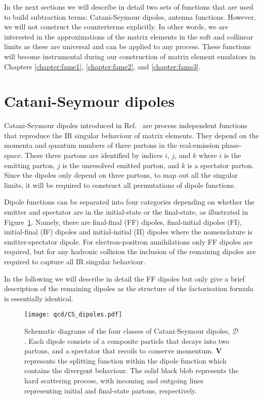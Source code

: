 \documentclass[main.tex]{subfiles}
\begin{document}
    In the next sections we will describe in detail two sets of functions
    that are used to build subtraction terms: Catani-Seymour dipoles,
    antenna functions. However, we will not construct the counterterms explicitly.
    In other words, we are interested in the approximations of the matrix elements
    in the soft and collinear limits as these are universal and can
    be applied to any process. These functions will become instrumental
    during our construction of matrix element emulators in Chapters
    \ref{chapter:fame1}, \ref{chapter:fame2}, and \ref{chapter:fame3}.

\section{Catani-Seymour dipoles}\label{sec:CS_dipoles}
    Catani-Seymour dipoles introduced in Ref.~\cite{Catani:1996vz}
    are process independent functions that reproduce the IR
    singular behaviour of matrix elements. They depend on the
    momenta and quantum numbers of three partons in the real-emission
    phase-space. These three partons are identified by indices
    $i$, $j$, and $k$ where $i$ is the emitting parton, $j$ is
    the unresolved emitted parton, and $k$ is a spectator parton.
    Since the dipoles only depend on three partons, to map out
    all the singular limits, it will be required to construct all
    permutations of dipole functions.

    Dipole functions can be separated into four categories
    depending on whether the emitter and spectator are in the
    initial-state or the final-state, as illustrated in Figure~\ref{fig:CS_dipoles}.
    Namely, there are final-final (FF) dipoles, final-initial dipoles (FI),
    initial-final (IF) dipoles and initial-initial (II) dipoles where
    the nomenclature is emitter-spectator dipole.
    For electron-positron annihilations only FF dipoles are required,
    but for any hadronic collision the inclusion of the remaining
    dipoles are required to capture all IR singular behaviour.

    In the following we will describe in detail the FF dipoles
    but only give a brief description of the remaining dipoles as
    the structure of the factorisation formula is essentially identical.

    \begin{figure}
        \texttt{[image: qcd/CS\_dipoles.pdf]}
        \caption{Schematic diagrams of the four classes of Catani-Seymour
        dipoles, $\mathcal{D}$. Each dipole consists of a composite particle
        that decays into two partons, and a spectator that recoils
        to conserve momentum. $\boldsymbol{V}$ represents the splitting
        function within the dipole function which contains the divergent
        behaviour. The solid black blob represents the hard scattering process,
        with incoming and outgoing lines representing initial and final-state
        partons, respectively.}
        \label{fig:CS_dipoles}
    \end{figure}
\end{document}
